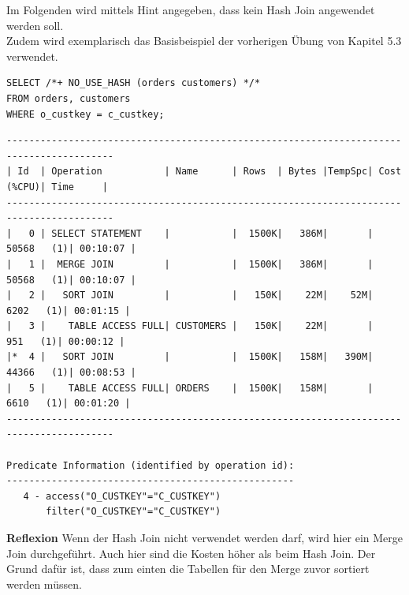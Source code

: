 \documentclass[10pt]{article}
\begin{document}
Im Folgenden wird mittels Hint angegeben, dass kein Hash Join angewendet werden soll.\\
Zudem wird exemplarisch das Basisbeispiel der vorherigen Übung von Kapitel 5.3 verwendet.
\begin{lstlisting}[style=sql]
SELECT /*+ NO_USE_HASH (orders customers) */*
FROM orders, customers
WHERE o_custkey = c_custkey;
\end{lstlisting}
\begin{lstlisting}[style=queryexecutionplan]
-----------------------------------------------------------------------------------------
| Id  | Operation           | Name      | Rows  | Bytes |TempSpc| Cost (%CPU)| Time     |
-----------------------------------------------------------------------------------------
|   0 | SELECT STATEMENT    |           |  1500K|   386M|       | 50568   (1)| 00:10:07 |
|   1 |  MERGE JOIN         |           |  1500K|   386M|       | 50568   (1)| 00:10:07 |
|   2 |   SORT JOIN         |           |   150K|    22M|    52M|  6202   (1)| 00:01:15 |
|   3 |    TABLE ACCESS FULL| CUSTOMERS |   150K|    22M|       |   951   (1)| 00:00:12 |
|*  4 |   SORT JOIN         |           |  1500K|   158M|   390M| 44366   (1)| 00:08:53 |
|   5 |    TABLE ACCESS FULL| ORDERS    |  1500K|   158M|       |  6610   (1)| 00:01:20 |
-----------------------------------------------------------------------------------------
 
Predicate Information (identified by operation id):
---------------------------------------------------
   4 - access("O_CUSTKEY"="C_CUSTKEY")
       filter("O_CUSTKEY"="C_CUSTKEY")
\end{lstlisting}
\textbf{Reflexion} \newline
Wenn der Hash Join nicht verwendet werden darf, wird hier ein Merge Join durchgeführt.
Auch hier sind die Kosten höher als beim Hash Join.
Der Grund dafür ist, dass zum einten die Tabellen für den Merge zuvor sortiert werden müssen.
\end{document}
